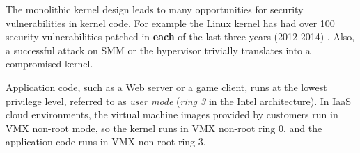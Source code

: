 The monolithic kernel design leads to many opportunities for security
vulnerabilities in kernel code. For example the Linux kernel has had over 100
security vulnerabilities patched in \textbf{each} of the last three years
(2012-2014) \cite{cvedetails2014linux} \cite{chen2011linux}. Also, a successful
attack on SMM or the hypervisor trivially translates into a compromised kernel.

Application code, such as a Web server or a game client, runs at the lowest
privilege level, referred to as \textit{user mode} (\textit{ring 3} in the
Intel architecture). In IaaS cloud environments, the virtual machine images
provided by customers run in VMX non-root mode, so the kernel runs in VMX
non-root ring 0, and the application code runs in VMX non-root ring 3.
